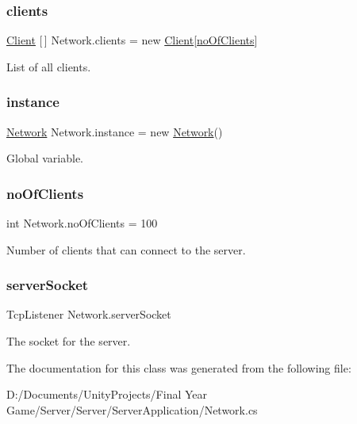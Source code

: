 \subsubsection{\texorpdfstring{clients}{clients}}
{\footnotesize\ttfamily \mbox{\hyperlink{class_client}{Client}} \mbox{[}$\,$\mbox{]} Network.\+clients = new \mbox{\hyperlink{class_client}{Client}}\mbox{[}\mbox{\hyperlink{class_network_a728ae99fddeb1561e1e521d134d92582}{no\+Of\+Clients}}\mbox{]}\hspace{0.3cm}{\ttfamily [static]}}



List of all clients. 

\mbox{\label{class_network_af63d25c25873f9220c94d6250a1c9242}} 
\subsubsection{\texorpdfstring{instance}{instance}}
{\footnotesize\ttfamily \mbox{\hyperlink{class_network}{Network}} Network.\+instance = new \mbox{\hyperlink{class_network}{Network}}()\hspace{0.3cm}{\ttfamily [static]}}



Global variable. 

\mbox{\label{class_network_a728ae99fddeb1561e1e521d134d92582}} 
\subsubsection{\texorpdfstring{noOfClients}{noOfClients}}
{\footnotesize\ttfamily int Network.\+no\+Of\+Clients = 100\hspace{0.3cm}{\ttfamily [static]}}



Number of clients that can connect to the server. 

\mbox{\label{class_network_ad3a8c496428c641ab10b4c0925762155}} 
\subsubsection{\texorpdfstring{serverSocket}{serverSocket}}
{\footnotesize\ttfamily Tcp\+Listener Network.\+server\+Socket}



The socket for the server. 



The documentation for this class was generated from the following file\+:\begin{DoxyCompactItemize}
\item 
D\+:/\+Documents/\+Unity\+Projects/\+Final Year Game/\+Server/\+Server/\+Server\+Application/Network.\+cs\end{DoxyCompactItemize}
